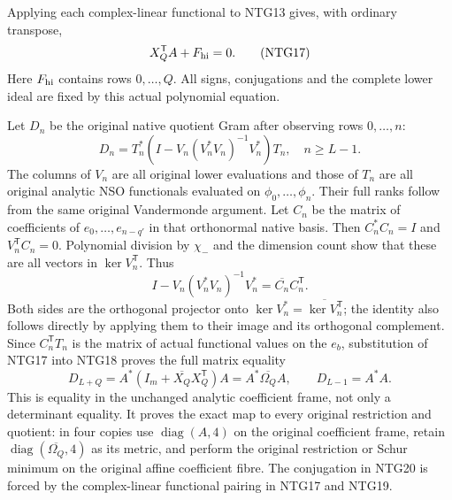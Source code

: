Applying each complex-linear functional to NTG13 gives,
with ordinary transpose,
\[
          X_Q^{\mathsf T}A+F_{\rm hi}=0 .
                                                               \tag{NTG17}
\]
Here $F_{\rm hi}$ contains rows $0,\ldots,Q$. All signs,
conjugations and the complete lower ideal are fixed by this
actual polynomial equation.

Let $D_n$ be the original native quotient Gram after observing
rows $0,\ldots,n$:
\[
 D_n=T_n^*(I-V_n(V_n^*V_n)^{-1}V_n^*)T_n,\quad n\ge L-1.
                                                               \tag{NTG18}
\]
The columns of $V_n$ are all original lower evaluations and
those of $T_n$ are all original analytic NSO functionals
evaluated on $\phi_0,\ldots,\phi_n$. Their full ranks follow
from the same original Vandermonde argument. Let $C_n$ be
the matrix of coefficients of $e_0,\ldots,e_{n-q'}$ in
that orthonormal native basis. Then $C_n^*C_n=I$ and
$V_n^{\mathsf T}C_n=0$. Polynomial division by $\chi_-$
and the dimension count show that these are all vectors
in $\ker V_n^{\mathsf T}$. Thus
\[
 I-V_n(V_n^*V_n)^{-1}V_n^*
       =\overline{C_n}C_n^{\mathsf T}.
                                                               \tag{NTG19}
\]
Both sides are the orthogonal projector onto
$\ker V_n^*=\overline{\ker V_n^{\mathsf T}}$; the identity
also follows directly by applying them to their image and
its orthogonal complement. Since $C_n^{\mathsf T}T_n$
is the matrix of actual functional values on the $e_b$,
substitution of NTG17 into NTG18 proves the full matrix equality
\[
 \boxed{\quad
 D_{L+Q}
   =A^*(I_m+\overline{X_Q}X_Q^{\mathsf T})A
   =A^*\overline{\Omega_Q}A,\qquad D_{L-1}=A^*A .
 \quad}                                                        \tag{NTG20}
\]
This is equality in the unchanged analytic coefficient frame,
not only a determinant equality. It proves the exact map to
every original restriction and quotient: in four copies use
$\operatorname{diag}(A,4)$ on the original coefficient frame,
retain $\operatorname{diag}(\overline{\Omega_Q},4)$ as its
metric, and perform the original restriction or Schur
minimum on the original affine coefficient fibre. The
conjugation in NTG20 is forced by the complex-linear
functional pairing in NTG17 and NTG19.

